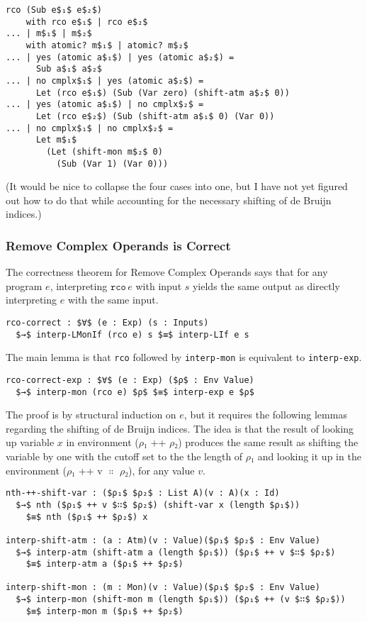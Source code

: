\documentclass[sigplan,review,dvipsnames,screen,10pt]{acmart}
\begin{document}
\begin{lstlisting}
rco (Sub e$₁$ e$₂$)
    with rco e$₁$ | rco e$₂$
... | m$₁$ | m$₂$
    with atomic? m$₁$ | atomic? m$₂$
... | yes (atomic a$₁$) | yes (atomic a$₂$) =
      Sub a$₁$ a$₂$
... | no cmplx$₁$ | yes (atomic a$₂$) =
      Let (rco e$₁$) (Sub (Var zero) (shift-atm a$₂$ 0))
... | yes (atomic a$₁$) | no cmplx$₂$ =
      Let (rco e$₂$) (Sub (shift-atm a$₁$ 0) (Var 0))
... | no cmplx$₁$ | no cmplx$₂$ = 
      Let m$₁$
        (Let (shift-mon m$₂$ 0)
          (Sub (Var 1) (Var 0)))
\end{lstlisting}

(It would be nice to collapse the four cases into one, but I have not
yet figured out how to do that while accounting for the necessary
shifting of de Bruijn indices.)

\subsubsection{Remove Complex Operands is Correct}

The correctness theorem for Remove Complex Operands says that for any
program $e$, interpreting $\mathtt{rco}\,e$ with input $s$ yields the
same output as directly interpreting $e$ with the same input.

\begin{lstlisting}
rco-correct : $∀$ (e : Exp) (s : Inputs)
  $→$ interp-LMonIf (rco e) s $≡$ interp-LIf e s 
\end{lstlisting}

The main lemma is that \lstinline{rco} followed by
\lstinline{interp-mon} is equivalent to \lstinline{interp-exp}.

\begin{lstlisting}
rco-correct-exp : $∀$ (e : Exp) ($ρ$ : Env Value)
  $→$ interp-mon (rco e) $ρ$ $≡$ interp-exp e $ρ$
\end{lstlisting}

The proof is by structural induction on $e$, but it requires the
following lemmas regarding the shifting of de Bruijn indices.
The idea is that the result of looking up variable $x$ in
environment ($ρ₁$ ++ $ρ₂$) produces the same result as
shifting the variable by one with the cutoff set to the
the length of $ρ₁$ and looking it up in the environment
($ρ₁$ ++ v $∷$ $ρ₂$), for any value $v$.

\begin{lstlisting}[basicstyle=\ttfamily\footnotesize]
nth-++-shift-var : ($ρ₁$ $ρ₂$ : List A)(v : A)(x : Id)
  $→$ nth ($ρ₁$ ++ v $∷$ $ρ₂$) (shift-var x (length $ρ₁$))
    $≡$ nth ($ρ₁$ ++ $ρ₂$) x

interp-shift-atm : (a : Atm)(v : Value)($ρ₁$ $ρ₂$ : Env Value)
  $→$ interp-atm (shift-atm a (length $ρ₁$)) ($ρ₁$ ++ v $∷$ $ρ₂$) 
    $≡$ interp-atm a ($ρ₁$ ++ $ρ₂$) 

interp-shift-mon : (m : Mon)(v : Value)($ρ₁$ $ρ₂$ : Env Value)
  $→$ interp-mon (shift-mon m (length $ρ₁$)) ($ρ₁$ ++ (v $∷$ $ρ₂$))
    $≡$ interp-mon m ($ρ₁$ ++ $ρ₂$)
\end{lstlisting}
\end{document}
